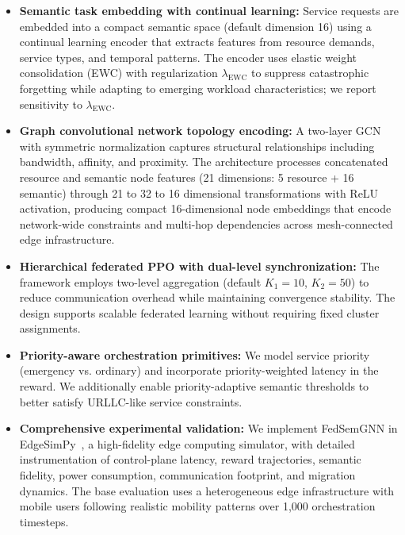 \documentclass[conference]{IEEEtran}
\begin{document}
	\begin{itemize}
		\item \textbf{Semantic task embedding with continual learning:} Service requests are embedded into a compact semantic space (default dimension 16) using a continual learning encoder that extracts features from resource demands, service types, and temporal patterns. The encoder uses elastic weight consolidation (EWC) with regularization $\lambda_{\mathrm{EWC}}$ to suppress catastrophic forgetting while adapting to emerging workload characteristics; we report sensitivity to $\lambda_{\mathrm{EWC}}$.
		
		\item \textcolor{revblue}{\textbf{Graph convolutional network topology encoding:} A two-layer GCN with symmetric normalization captures structural relationships including bandwidth, affinity, and proximity. The architecture processes concatenated resource and semantic node features (21 dimensions: 5 resource + 16 semantic) through 21 to 32 to 16 dimensional transformations with ReLU activation, producing compact 16-dimensional node embeddings that encode network-wide constraints and multi-hop dependencies across mesh-connected edge infrastructure.}
		
		\item \textbf{Hierarchical federated PPO with dual-level synchronization:} The framework employs two-level aggregation (default $K_1{=}10$, $K_2{=}50$) to reduce communication overhead while maintaining convergence stability. The design supports scalable federated learning without requiring fixed cluster assignments.
		
		\item \textbf{Priority-aware orchestration primitives:} We model service priority (emergency vs. ordinary) and incorporate priority-weighted latency in the reward. We additionally enable priority-adaptive semantic thresholds to better satisfy URLLC-like service constraints.
		
		\item \textbf{Comprehensive experimental validation:} We implement FedSemGNN in EdgeSimPy~\cite{souza2023edgesimpy}, a high-fidelity edge computing simulator, with detailed instrumentation of control-plane latency, reward trajectories, semantic fidelity, power consumption, communication footprint, and migration dynamics. The base evaluation uses a heterogeneous edge infrastructure with mobile users following realistic mobility patterns over 1,000 orchestration timesteps.
		

\end{itemize}
\end{document}
